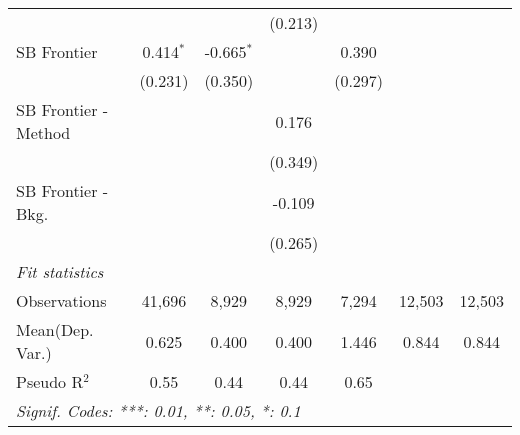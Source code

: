 \begin{tabular}{lcccccc}
                        &               &              & (0.213) &               &        &   \\   
   SB Frontier          & 0.414$^{*}$   & -0.665$^{*}$ &         & 0.390         &        &   \\   
                        & (0.231)       & (0.350)      &         & (0.297)       &        &   \\   
   SB Frontier - Method &               &              & 0.176   &               &        &   \\   
                        &               &              & (0.349) &               &        &   \\   
   SB Frontier - Bkg.   &               &              & -0.109  &               &        &   \\   
                        &               &              & (0.265) &               &        &   \\   
   \midrule
   \emph{Fit statistics}\\
   Observations         & 41,696        & 8,929        & 8,929   & 7,294         & 12,503 & 12,503\\  
Mean(Dep. Var.) & 0.625 & 0.400 & 0.400 & 1.446 & 0.844 & 0.844 \\
   Pseudo R$^2$         & 0.55          & 0.44         & 0.44    & 0.65          &        & \\  
   \midrule \midrule
   \multicolumn{7}{l}{\emph{Signif. Codes: ***: 0.01, **: 0.05, *: 0.1}}\\
\end{tabular}
\par\endgroup
